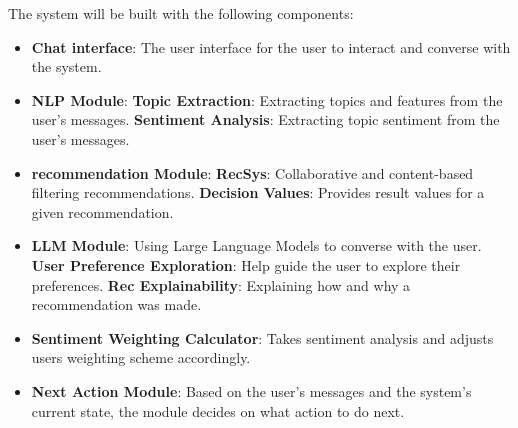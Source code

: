 The system will be built with the following components:
\begin{itemize}
    \item \textbf{Chat interface}: The user interface for the user to interact and converse with the system.
    
    \item \textbf{NLP Module}:
    \subitem \textbf{Topic Extraction}: Extracting topics and features from the user's messages.
    \subitem \textbf{Sentiment Analysis}: Extracting topic sentiment from the user's messages.

    \item \textbf{recommendation Module}:
    \subitem \textbf{RecSys}: Collaborative and content-based filtering recommendations.
    \subitem \textbf{Decision Values}: Provides result values for a given recommendation.

    \item \textbf{LLM Module}: Using Large Language Models to converse with the user.
    \subitem \textbf{User Preference Exploration}: Help guide the user to explore their preferences.
    \subitem \textbf{Rec Explainability}: Explaining how and why a recommendation was made.

    \item \textbf{Sentiment Weighting Calculator}: Takes sentiment analysis and adjusts users weighting scheme accordingly. 
    
    \item \textbf{Next Action Module}: Based on the user's messages and the system's current state, the module decides on what action to do next.

\end{itemize}







